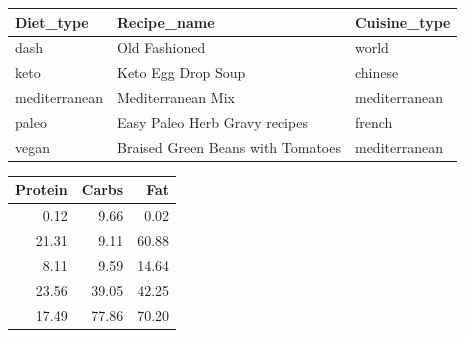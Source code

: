 \documentclass[12pt,a4paper]{article}
\begin{document}
{{            \begin{center}       
                \begin{tabular}{lll}
                    \toprule
                    \textbf{Diet\_type} & \textbf{Recipe\_name} & \textbf{Cuisine\_type} \\
                    \midrule
                    dash          & Old Fashioned                     & world \\
                    keto          & Keto Egg Drop Soup                & chinese \\
                    mediterranean & Mediterranean Mix                 & mediterranean \\
                    paleo         & Easy Paleo Herb Gravy recipes     & french \\
                    vegan         & Braised Green Beans with Tomatoes & mediterranean \\
                    \bottomrule
                \end{tabular}
            \end{center}
            
            \begin{center}
                \begin{tabular}{rrr}
                    \toprule
                    \textbf{Protein} & \textbf{Carbs} & \textbf{Fat} \\
                    \midrule
                    0.12 &  9.66 &  0.02 \\
                    21.31 &  9.11 & 60.88 \\
                    8.11 &  9.59 & 14.64 \\
                    23.56 & 39.05 & 42.25 \\
                    17.49 & 77.86 & 70.20 \\
                    \bottomrule
                \end{tabular}
            \end{center}
            }
    }

    \newpage
\end{document}
